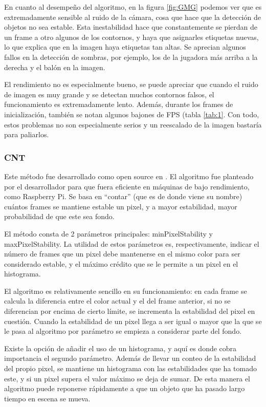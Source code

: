 En cuanto al desempeño del algoritmo, en la figura \ref{fig:GMG} podemos ver que es extremadamente sensible al ruido de la cámara, cosa que hace que la detección de objetos no sea estable. Esta inestabilidad hace que constantemente se pierdan de un frame a otro algunos de los contornos, y haya que asignarles etiquetas nuevas, lo que explica que en la imagen haya etiquetas tan altas. Se aprecian algunos fallos en la detección de sombras, por ejemplo, los de la jugadora más arriba a la derecha y el balón en la imagen. 

El rendimiento no es especialmente bueno, se puede apreciar que cuando el ruido de imagen es muy grande y se detectan muchos contornos falsos, el funcionamiento es extremadamente lento. Además, durante los frames de inicialización, también se notan algunos bajones de FPS (tabla \ref{tab:1}. Con todo, estos problemas no son especialmente serios y un reescalado de la imagen bastaría para paliarlos.


\subsubsection*{CNT}
Este método fue desarrollado como open source en \cite{git:CNT}. El algoritmo fue planteado por el desarrollador para que fuera eficiente en máquinas de bajo rendimiento, como Raspberry Pi. Se basa en ``contar'' (que es de donde viene su nombre) cuántos frames se mantiene estable un pixel, y a mayor estabilidad, mayor probabilidad de que este sea fondo.

El método consta de 2 parámetros principales: minPixelStability y maxPixelStability. La utilidad de estos parámetros es, respectivamente, indicar el número de frames que un pixel debe mantenerse en el mismo color para ser considerado estable, y el máximo crédito que se le permite a un pixel en el histograma.

El algoritmo es relativamente sencillo en su funcionamiento: en cada frame se calcula la diferencia entre el color actual y el del frame anterior, si no se diferencian por encima de cierto límite, se incrementa la estabilidad del pixel en cuestión. Cuando la estabilidad de un pixel llega a ser igual o mayor que la que se le pasa al algoritmo por parámetro se empieza a considerar parte del fondo.

Existe la opción de añadir el uso de un histograma, y aquí es donde cobra importancia el segundo parámetro. Además de llevar un conteo de la estabilidad del propio pixel, se mantiene un histograma con las estabilidades que ha tomado este, y si un pixel supera el valor máximo se deja de sumar. De esta manera el algoritmo puede reponerse rápidamente a que un objeto que ha pasado largo tiempo en escena se mueva.

